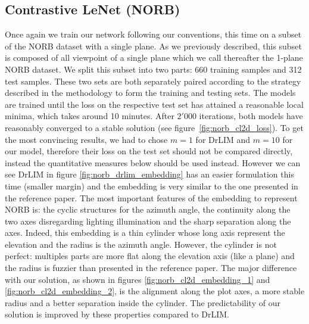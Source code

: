\documentclass[a4paper,12pt]{report}
\begin{document}
\subsection{Contrastive LeNet (NORB)}
Once again we train our network following our conventions, this time on a subset of the NORB dataset with a single plane.
As we previously described, this subset is composed of all viewpoint of a single plane which we call thereafter the 1-plane NORB dataset.
We split this subset into two parts: 660 training samples and 312 test samples.
These two sets are both separately paired according to the strategy described in the methodology to form the training and testing sets.
The models are trained until the loss on the respective test set has attained a reasonable local minima, which takes around 10 minutes.
After $2'000$ iterations, both models have reasonably converged to a stable solution (see figure~\ref{fig:norb_cl2d_loss}).
To get the most convincing results, we had to chose $m=1$ for DrLIM and $m=10$ for our model, therefore their loss on the test set should not be compared directly, instead the quantitative measures below should be used instead.
However we can see DrLIM in figure \ref{fig:norb_drlim_embedding} has an easier formulation this time (smaller margin) and the embedding is very similar to the one presented in the reference paper.
The most important features of the embedding to represent NORB is: the cyclic structures for the azimuth angle, the continuity along the two axes disregarding lighting illumination and the sharp separation along the axes.
Indeed, this embedding is a thin cylinder whose long axis represent the elevation and the radius is the azimuth angle.
However, the cylinder is not perfect: multiples parts are more flat along the elevation axis (like a plane) and the radius is fuzzier than presented in the reference paper.
The major difference with our solution, as shown in figures \ref{fig:norb_cl2d_embedding_1} and \ref{fig:norb_cl2d_embedding_2}, is the alignment along the plot axes, a more stable radius and a better separation inside the cylinder.
The predictability of our solution is improved by these properties compared to DrLIM.
\end{document}
